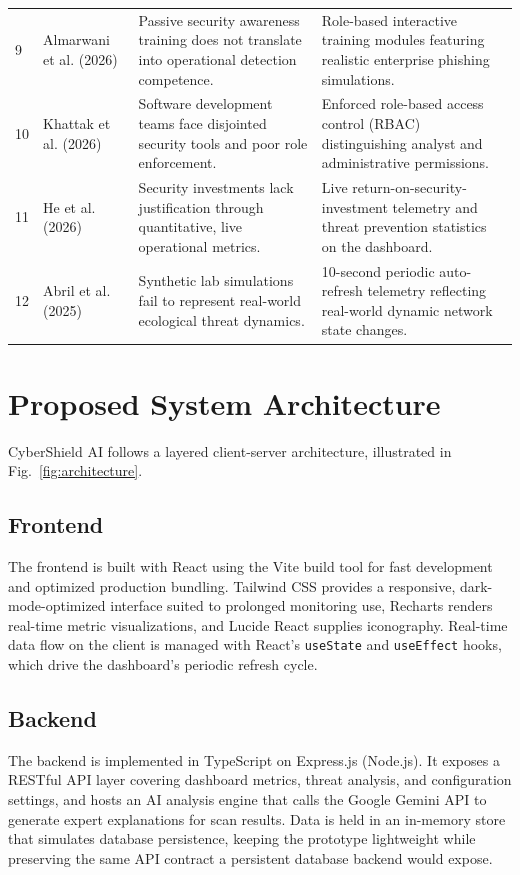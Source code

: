 \documentclass[conference]{IEEEtran}
\begin{document}
\begin{table}[t]
\begin{tabularx}{\textwidth}{p{0.5cm}p{5.2cm}p{5.5cm}X}
9 & Almarwani et al. (2026) \cite{almarwani2026ai} & Passive security awareness training does not translate into operational detection competence. & Role-based interactive training modules featuring realistic enterprise phishing simulations. \\
10 & Khattak et al. (2026) \cite{khattak2026cyber} & Software development teams face disjointed security tools and poor role enforcement. & Enforced role-based access control (RBAC) distinguishing analyst and administrative permissions. \\
11 & He et al. (2026) \cite{he2026enhancing} & Security investments lack justification through quantitative, live operational metrics. & Live return-on-security-investment telemetry and threat prevention statistics on the dashboard. \\
12 & Abril et al. (2025) \cite{abril2025exploring} & Synthetic lab simulations fail to represent real-world ecological threat dynamics. & 10-second periodic auto-refresh telemetry reflecting real-world dynamic network state changes. \\
\bottomrule
\end{tabularx}
\end{table}

\section{Proposed System Architecture}
CyberShield AI follows a layered client-server architecture, illustrated in Fig.~\ref{fig:architecture}.

\subsection{Frontend}
The frontend is built with React using the Vite build tool for fast development and optimized production bundling. Tailwind CSS provides a responsive, dark-mode-optimized interface suited to prolonged monitoring use, Recharts renders real-time metric visualizations, and Lucide React supplies iconography. Real-time data flow on the client is managed with React's \texttt{useState} and \texttt{useEffect} hooks, which drive the dashboard's periodic refresh cycle.

\subsection{Backend}
The backend is implemented in TypeScript on Express.js (Node.js). It exposes a RESTful API layer covering dashboard metrics, threat analysis, and configuration settings, and hosts an AI analysis engine that calls the Google Gemini API to generate expert explanations for scan results. Data is held in an in-memory store that simulates database persistence, keeping the prototype lightweight while preserving the same API contract a persistent database backend would expose.
\end{document}
